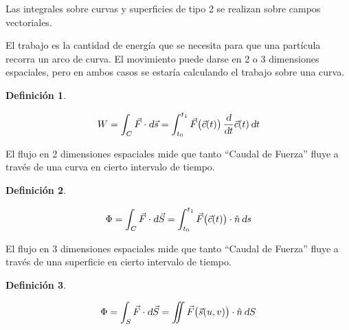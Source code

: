 \documentclass[a5paper,12pt,twoside]{book}
\newtheorem{defn}{{Definición}}[chapter]
\begin{document}

Las integrales sobre curvas y superficies de tipo 2 se realizan sobre campos vectoriales.

El trabajo es la cantidad de energía que se necesita para que una partícula recorra un arco de curva.
El movimiento puede darse en 2 o 3 dimensiones espaciales, pero en ambos casos se estaría calculando el trabajo sobre una curva.

\begin{mdframed}[style=DefinitionFrame]
    \begin{defn}
        \label{defn:type2Int}
    \end{defn}
    \begin{equation*}
        W = \int_C \Vec{F} \cdot \textsl{d} \Vec{s}
        = \int_{t_0}^{t_1} \Vec{F} \big( \Vec{c}(t) \big) \, \dfrac{\textsl{d}}{\textsl{d} t} \Vec{c}(t) \, \textsl{d} t
    \end{equation*}
\end{mdframed}

El flujo en 2 dimensiones espaciales mide que tanto ``Caudal de Fuerza'' fluye a través de una curva en cierto intervalo de tiempo.

\begin{mdframed}[style=DefinitionFrame]
    \begin{defn}
    \end{defn}
    \begin{equation*}
        \Phi = \int_C \Vec{F} \cdot \textsl{d} \Vec{S}
        = \int_{t_0}^{t_1} \Vec{F} \big( \Vec{c}(t) \big) \cdot \hat{n} \, \textsl{d} s
    \end{equation*}
\end{mdframed}

El flujo en 3 dimensiones espaciales mide que tanto ``Caudal de Fuerza'' fluye a través de una superficie en cierto intervalo de tiempo.

\begin{mdframed}[style=DefinitionFrame]
    \begin{defn}
    \end{defn}
    \begin{equation*}
        \Phi = \int_S \Vec{F} \cdot \textsl{d} \Vec{S}
        = \iint \Vec{F} \big( \Vec{s}(u,v) \big) \cdot \hat{n} \, \textsl{d} S
    \end{equation*}
\end{mdframed}
\end{document}
